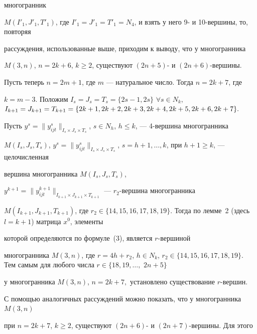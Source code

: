 многогранник\linebreak


$M(I'_1,J'_1,T'_1)$, где $I'_1=J'_1


=T'_1=N_4$, и взять у него 9- и 10-вершины, то, повторяя


рассуждения, использованные выше, приходим к выводу, что у многогранника


$M(3,n)$, $n=2k+6$, $k\geq 2$, существуют $(2n+5)$- и $(2n+6)$-вершины.





Пусть теперь $n=2m+1$, где $m$ --- натуральное число. Тогда $n=2k+7$, где


$k=m-3$. Положим $I_s=J_s=T_s=\{2s{-}1,2s\}$ $\forall s{\in}N_k,$ $I_{k+1}=


J_{k+1}=T_{k+1}=\{2k+1,2k+2,2k+3,2k+4,2k+5,\linebreak 2k+6,2k+7\}.$


Пусть $y^s=\|y^s_{ijt}\|_{I_s\times J_s\times T_s}$, $s


\in N_h$, $h\leq k$, --- 4-вершина многогранника


$M(I_s,J_s,T_s)$, $y^s=\|y^s_{ijt}\|_{I_s\times J_s


\times T_s}$, $s=h+1,\dotsc,k$, при $h+1\geq k$, --- целочисленная


вершина многогранника $M(I_s,J_s,T_s)$,


$y^{k+1}=\|y^{k+1}_{ijt}


\|_{I_{k+1}\times J_{k+1}\times T_{k+1}}$ --- $r_2$-вершина многогранника


$M(I_{k+1},J_{k+1},T_{k+1})$, где $r_2\in\{14, 15,16,


17,18,19\}.$ Тогда по лемме~2 (здесь $l=k+1$) матрица $x^0$, элементы


которой определяются по формуле~(3), является $r$-вершиной


многогранника $M(3,n)$, где $r=4h+r_2$, $h\in N_k$, $r_2\in\{14,15,16,


17,18,19\}.$ Тем самым для любого числа $r\in\{18,19,\dotsc,$ $2n+5\}$


у многогранника $M(3,n)$, $n=2k+7,$ установлено существование $r$-вершин.





С помощью аналогичных рассуждений можно показать, что у многогранника $M(3,n)$


при $n=2k+7$, $k\geq 2$, существуют $(2n+6)$- и $(2n+7)$-вершины. Для этого


